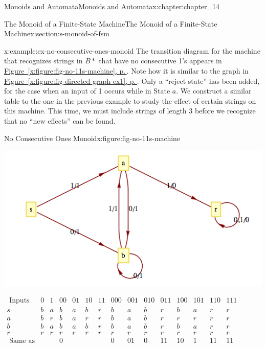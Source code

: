 \documentclass[twoside,10pt,]{book}
\newcommand{\xreffont}{\relax}
\numberwithin{equation}{section}
\begin{document}
\begin{chapterptx}{Monoids and Automata}{}{Monoids and Automata}{}{}{x:chapter:chapter_14}
\begin{sectionptx}{The Monoid of a Finite-State Machine}{}{The Monoid of a Finite-State Machine}{}{}{x:section:s-monoid-of-fsm}
\begin{example}{}{x:example:ex-no-consecutive-ones-monoid}
The transition diagram for the machine that recognizes strings in \(B*\)  that have no consecutive 1's appears in \hyperref[x:figure:fig-no-11s-machine]{Figure~{\xreffont\ref{x:figure:fig-no-11s-machine}}, p.\,\pageref{x:figure:fig-no-11s-machine}}. Note how it is similar to the graph in \hyperref[x:figure:fig-directed-graph-ex1]{Figure~{\xreffont\ref{x:figure:fig-directed-graph-ex1}}, p.\,\pageref{x:figure:fig-directed-graph-ex1}}. Only a ``reject state'' has been added, for the case when an input of 1 occurs while in State \(a\). We construct a similar table to the one in the previous example to study the effect of certain strings on this machine. This time, we must include strings of length 3 before we recognize that no ``new effects'' can be found.%
\begin{figureptx}{No Consecutive Ones Monoid}{x:figure:fig-no-11s-machine}{}%
\begin{image}{0.15}{0.7}{0.15}%
\includegraphics[width=\linewidth]{images/fig-no-11s-machine.png}
\end{image}%
\tcblower
\end{figureptx}%
\(\begin{array}{ccccccccccccccc}
\textrm{ Inputs} & 0 & 1 & 00 & 01 & 10 & 11 & 000 & 001 & 010 & 011 & 100 & 101 & 110 & 111 \\
s & b & a & b & a & b & r & b & a & b & r & b & a & r & r \\
a & b & r & b & a & r & r & b & a & b & r & r & r & r & r \\
b & b & a & b & a & b & r & b & a & b & r & b & a & r & r \\
r & r & r & r & r & r & r & r & r & r & r & r & r & r & r \\
\textrm{ Same} \textrm{ as} &   &   & 0 &   &   &   & 0 & 01 & 0 & 11 & 10 & 1 & 11 & 11 \\
\end{array}\)%

\end{example}
\end{sectionptx}
\end{chapterptx}
\end{document}
